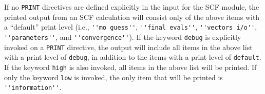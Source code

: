 If no \verb+PRINT+ directives are defined explicitly in the input for
the SCF module, the printed output from an SCF calculation will
consist only of the above items with a ``default'' print level (i.e.,
\verb+''mo guess''+, \verb+''final evals''+, \verb+''vectors i/o''+,
\verb+''parameters''+, and \verb+''convergence''+).  If the keyword
\verb+debug+ is explicitly invoked on a \verb+PRINT+ directive, the
output will include all items in the above list with a print level of
\verb+debug+, in addition to the items with a print level of
\verb+default+.  If the keyword \verb+high+ is also invoked, all items
in the above list will be printed.  If only the keyword \verb+low+ is
invoked, the only item that will be printed is \verb+''information''+.



